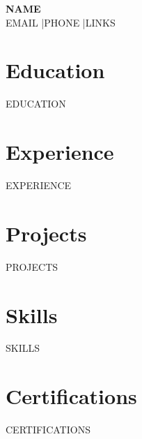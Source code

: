 \documentclass[a4paper,10pt]{article}
\begin{document}
\begin{center}
{\LARGE\bfseries NAME}\\[3pt]
EMAIL \enspace|\enspace PHONE \enspace|\enspace LINKS
\end{center}

\section{Education}
EDUCATION

\section{Experience}
EXPERIENCE

\section{Projects}
PROJECTS

\section{Skills}
SKILLS

\section{Certifications}
CERTIFICATIONS
\end{document}
